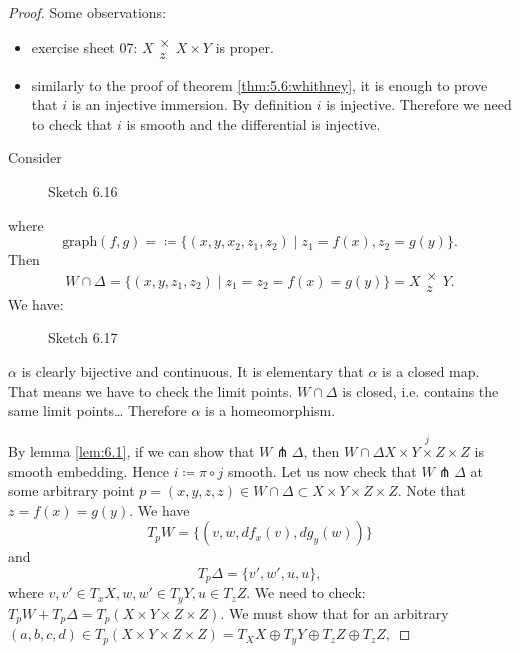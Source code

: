 \begin{proof}
    Some observations:
    \begin{itemize}
        \item exercise sheet 07: \(X\substack{\times\\z}X\times Y\) is proper.
        \item similarly to the proof of theorem \ref{thm:5.6:whithney}, it is enough to prove that 
              \(i\) is an injective immersion. By definition \(i\) is injective. Therefore we need to check that \(i\) is smooth and the differential is injective.
    \end{itemize}

    Consider 
    \begin{figure}[H]\label{fig:6.16}
        \centering
        \caption{Sketch 6.16}
    \end{figure}        
    where \[\text{graph}(f,g)=\coloneqq \{(x,y,x_2,z_1,z_2)\mid z_1=f(x),z_2=g(y)\}.\]
    Then \[W\cap \Delta=\{(x,y,z_1,z_2)\mid z_1=z_2=f(x)=g(y)\}=X\substack{\times\\z}Y.\]
    We have:
    \begin{figure}[H]\label{fig:6.17}
        \centering
        \caption{Sketch 6.17}
    \end{figure} 
    \(\alpha\) is clearly bijective and continuous. It is elementary that \(\alpha\) is a closed map.
    That means we have to check the limit points. \(W\cap \Delta\) is closed, i.e. contains the same limit points\dots   
    Therefore \(\alpha\) is a homeomorphism.

    By lemma \ref{lem:6.1}, if we can show that \(W\pitchfork \Delta\), then \(W\cap \Delta\stackrel{j}{X\times Y\times Z\times Z}\) is smooth embedding. 
    Hence \(i\coloneqq \pi\circ j\) smooth. Let us now check that \(W\pitchfork \Delta\) at some arbitrary point \(p=(x,y,z,z)\in W\cap \Delta\subset X\times Y\times Z\times Z\).
    Note that \(z=f(x)=g(y)\). We have \[T_pW=\{(v,w,df_x(v),dg_y(w))\}\]
    and 
    \[T_p\Delta=\{v',w',u,u\},\]
    where \(v,v'\in T_xX,w,w'\in T_yY,u\in T_zZ.\)
    We need to check: \(T_p W+T_p\Delta=T_p(X\times Y\times Z\times Z)\). We must show that for an arbitrary \((a,b,c,d)\in T_p(X\times Y\times Z\times Z)=T_XX\oplus T_yY\oplus T_zZ \oplus T_zZ,\)


\end{proof}


